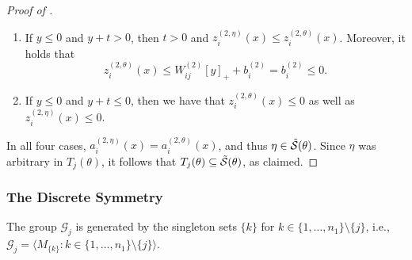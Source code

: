 \documentclass{article}
\theoremstyle{definition}
\newcommand{\weights}[1]{W^{(#1)}}
\newcommand{\bias}[1]{b^{(#1)}}
\newcommand{\activation}[1]{a^{(#1)}}
\newcommand{\preactivation}[1]{z^{(#1)}}
\newcommand{\gfiber}[1]{\Tilde{\mathcal{S}}({#1})}
\begin{document}
\begin{proof}[Proof of ]
\begin{enumerate}
\item 
If $y\leq0$ and $y+t>0$, then $t>0$ and 
$\preactivation{2,\eta}_i(x) \leq \preactivation{2,\theta}_i(x)$. Moreover, it holds that \[\preactivation{2,\theta}_i(x) \leq \weights{2}_{ij}[y]_+ + \bias{2}_i=  \bias{2}_i\leq 0.\] 

\item 
If $y\leq0$ and $y+t\leq0$, then we have that  \(\preactivation{2,\theta}_i(x) \leq 0 \) as well as \(\preactivation{2,\eta}_i(x) \leq 0 \). 
\end{enumerate} 

In all four cases, $\activation{2,\eta}_i(x) = \activation{2,\theta}_i(x)$, and thus $\eta \in \gfiber{\theta}$. 
%
Since $\eta$ was arbitrary in $T_j(\theta)$, it follows that $T_j(\theta)\subseteq\gfiber{\theta}$, as claimed. 
%
\end{proof} 


\subsubsection*{The Discrete Symmetry} 
The group $\mathcal{G}_j$ is generated by the singleton sets $\{k\}$ for $k \in \{1,\dots,n_1\}\setminus\{j\}$, i.e.,
\(
\mathcal{G}_j = \big\langle M_{\{k\}} : k \in \{1,\dots,n_1\} \setminus \{j\} \big\rangle.
\)

\propflippinghiddenhyperplaneinclusion* 
\end{document}
